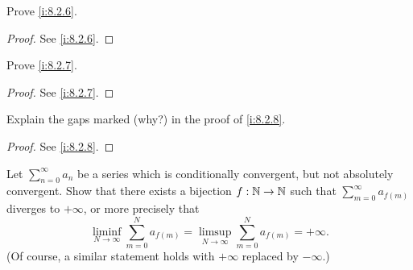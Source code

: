 \begin{ex}\label{i:ex:8.2.3}
  Prove \cref{i:8.2.6}.
\end{ex}

\begin{proof}
  See \cref{i:8.2.6}.
\end{proof}

\begin{ex}\label{i:ex:8.2.4}
  Prove \cref{i:8.2.7}.
\end{ex}

\begin{proof}
  See \cref{i:8.2.7}.
\end{proof}

\begin{ex}\label{i:ex:8.2.5}
  Explain the gaps marked (why?) in the proof of \cref{i:8.2.8}.
\end{ex}

\begin{proof}
  See \cref{i:8.2.8}.
\end{proof}

\begin{ex}\label{i:ex:8.2.6}
  Let \(\sum_{n = 0}^\infty a_n\) be a series which is conditionally convergent, but not absolutely convergent.
  Show that there exists a bijection \(f : \mathbb{N} \to \mathbb{N}\) such that \(\sum_{m = 0}^\infty a_{f(m)}\) diverges to \(+\infty\), or more precisely that
  \[
    \liminf_{N \to \infty} \sum_{m = 0}^N a_{f(m)} = \limsup_{N \to \infty} \sum_{m = 0}^N a_{f(m)} = +\infty.
  \]
  (Of course, a similar statement holds with \(+\infty\) replaced by \(-\infty\).)
\end{ex}

